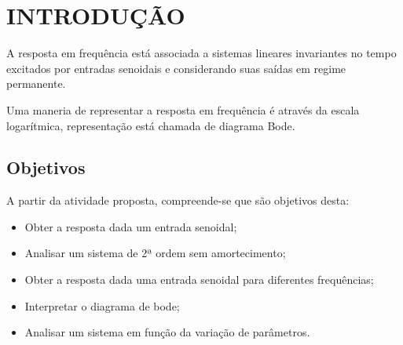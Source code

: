 \section{INTRODUÇÃO}
A resposta em frequência está associada a sistemas lineares invariantes no tempo excitados por entradas senoidais e considerando suas saídas em regime permanente.

Uma maneria de representar a resposta em frequência é através da escala logarítmica, representação está chamada de diagrama Bode.

\subsection{Objetivos}
    A partir da atividade proposta, compreende-se que são objetivos desta:
    
    \begin{itemize}
    	\item Obter a resposta dada um entrada senoidal;
    	\item Analisar um sistema de 2ª ordem sem amortecimento;
    	\item Obter a resposta dada uma entrada senoidal para diferentes frequências;
    	\item Interpretar o diagrama de bode;
    	\item Analisar um sistema em função da variação de parâmetros.
    \end{itemize}